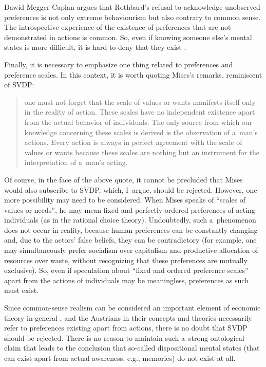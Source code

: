 \begin{artengenv}{Dawid Megger}
Caplan argues that Rothbard's refusal to acknowledge unobserved preferences is not only extreme behaviourism but also contrary to common sense. The introspective experience of the existence of preferences that are not demonstrated in actions is common. So, even if knowing someone else's mental states is more difficult, it is hard to deny that they exist 
\parencite[][p.834]{caplan_austrian_1999}.%




Finally, it is necessary to emphasize one thing related to preferences and preference scales. In this context, it is worth quoting Mises's remarks, reminiscent of SVDP:



\begin{quote}
one must not forget that the scale of values or wants manifests itself only in the reality of action. These scales have no independent existence apart from the actual behavior of individuals. The only source from which our knowledge concerning these scales is derived is the observation of a~man's actions. Every action is always in perfect agreement with the scale of values or wants because these scales are nothing but an instrument for the interpretation of a~man's acting. 
\parencite[][p.95]{mises_human_1998}%
\end{quote}




Of course, in the face of the above quote, it cannot be precluded that Mises would also subscribe to SVDP, which, I~argue, should be rejected. However, one more possibility may need to be considered. When Mises speaks of ``scales of values or needs'', he may mean fixed and perfectly ordered preferences of acting individuals (as in the rational choice theory). Undoubtedly, such a~phenomenon does not occur in reality, because human preferences can be constantly changing and, due to the actors' false beliefs, they can be contradictory (for example, one may simultaneously prefer socialism over capitalism and productive allocation of resources over waste, without recognizing that these preferences are mutually exclusive). So, even if speculation about ``fixed and ordered preference scales'' apart from the actions of individuals may be meaningless, preferences as such must exist.



Since common-sense realism can be considered an important element of economic theory in general 
\parencite[][]{hausman_realism_2008}, %
 and the Austrians in their concepts and theories necessarily refer to preferences existing apart from actions, there is no doubt that SVDP should be rejected. There is no reason to maintain such a~strong ontological claim that leads to the conclusion that so-called dispositional mental states (that can exist apart from actual awareness, e.g., memories) do not exist at all.




\end{artengenv}
